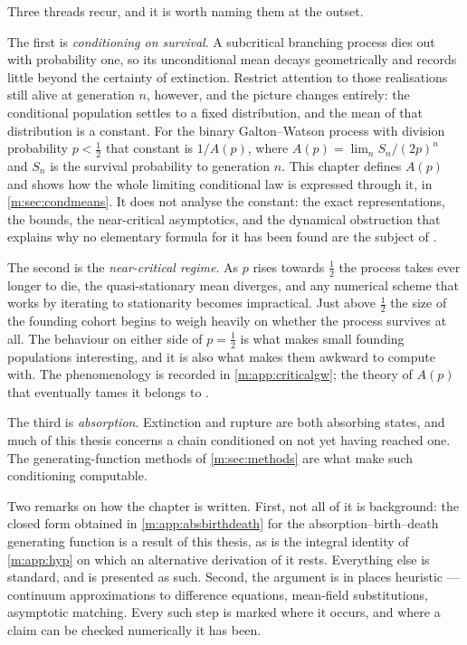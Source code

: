 Three threads recur, and it is worth naming them at the outset.

The first is \emph{conditioning on survival}. A subcritical branching process dies
out with probability one, so its unconditional mean decays geometrically and
records little beyond the certainty of extinction. Restrict attention to those
realisations still alive at generation $n$, however, and the picture changes
entirely: the conditional population settles to a fixed distribution, and the mean
of that distribution is a constant. For the binary Galton--Watson process with
division probability $p<\tfrac12$ that constant is $1/A(p)$, where
$A(p) = \lim_n S_n/(2p)^n$ and $S_n$ is the survival probability to generation $n$.
This chapter defines $A(p)$ and shows how the whole limiting conditional law is
expressed through it, in \cref{m:sec:condmeans}. It does not analyse the constant:
the exact representations, the bounds, the near-critical asymptotics, and the
dynamical obstruction that explains why no elementary formula for it has been found
are the subject of \ChA.

The second is the \emph{near-critical regime}. As $p$ rises towards $\tfrac12$ the
process takes ever longer to die, the quasi-stationary mean diverges, and any
numerical scheme that works by iterating to stationarity becomes impractical. Just
above $\tfrac12$ the size of the founding cohort begins to weigh heavily on whether
the process survives at all. The behaviour on either side of $p=\tfrac12$ is what
makes small founding populations interesting, and it is also what makes them
awkward to compute with. The phenomenology is recorded in \cref{m:app:criticalgw};
the theory of $A(p)$ that eventually tames it belongs to \ChA.

The third is \emph{absorption}. Extinction and rupture are both absorbing states,
and much of this thesis concerns a chain conditioned on not yet having reached one.
The generating-function methods of \cref{m:sec:methods} are what make such
conditioning computable.

Two remarks on how the chapter is written. First, not all of it is background: the
closed form obtained in \cref{m:app:absbirthdeath} for the absorption--birth--death
generating function is a result of this thesis, as is the integral identity of
\cref{m:app:hyp} on which an alternative derivation of it rests. Everything else is
standard, and is presented as such. Second, the argument is in places heuristic ---
continuum approximations to difference equations, mean-field substitutions,
asymptotic matching. Every such step is marked where it occurs, and where a claim
can be checked numerically it has been.
